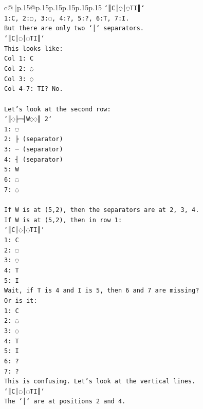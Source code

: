 \documentclass{article}
\begin{document}
{\begin{supertabular}{c@{$\;$}|p{.15\linewidth}@{}p{.15\linewidth}p{.15\linewidth}p{.15\linewidth}p{.15\linewidth}p{.15\linewidth}}
{{{\texttt{`║C│◌│◌TI║`} \\
\texttt{1:C, 2:◌, 3:◌, 4:?, 5:?, 6:T, 7:I.} \\
\texttt{But there are only two `│` separators.} \\
\texttt{`║C│◌│◌TI║`} \\
\texttt{This looks like:} \\
\texttt{Col 1: C} \\
\texttt{Col 2: ◌} \\
\texttt{Col 3: ◌} \\
\texttt{Col 4{-}7: TI? No.} \\
\\ 
\texttt{Let's look at the second row:} \\
\texttt{`║◌├─┤W◌◌║ 2`} \\
\texttt{1: ◌} \\
\texttt{2: ├ (separator)} \\
\texttt{3: ─ (separator)} \\
\texttt{4: ┤ (separator)} \\
\texttt{5: W} \\
\texttt{6: ◌} \\
\texttt{7: ◌} \\
\\ 
\texttt{If W is at (5,2), then the separators are at 2, 3, 4.} \\
\texttt{If W is at (5,2), then in row 1:} \\
\texttt{`║C│◌│◌TI║`} \\
\texttt{1: C} \\
\texttt{2: ◌} \\
\texttt{3: ◌} \\
\texttt{4: T} \\
\texttt{5: I} \\
\texttt{Wait, if T is 4 and I is 5, then 6 and 7 are missing?} \\
\texttt{Or is it:} \\
\texttt{1: C} \\
\texttt{2: ◌} \\
\texttt{3: ◌} \\
\texttt{4: T} \\
\texttt{5: I} \\
\texttt{6: ?} \\
\texttt{7: ?} \\
\texttt{This is confusing. Let's look at the vertical lines.} \\
\texttt{`║C│◌│◌TI║`} \\
\texttt{The `│` are at positions 2 and 4.} \\
}}}
\end{supertabular}}
\end{document}
